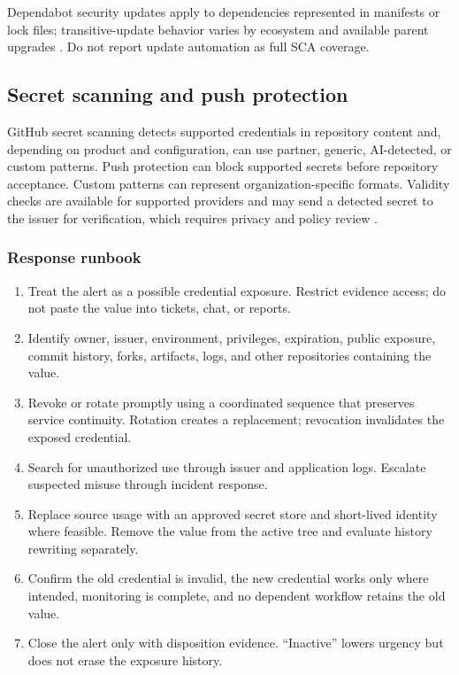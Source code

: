 \documentclass[11pt,letterpaper]{article}
\begin{document}
Dependabot security updates apply to dependencies represented in manifests or lock files; transitive-update behavior varies by ecosystem and available parent upgrades \citep{githubdependabot}. Do not report update automation as full SCA coverage.

\subsection{Secret scanning and push protection}

GitHub secret scanning detects supported credentials in repository content and, depending on product and configuration, can use partner, generic, AI-detected, or custom patterns. Push protection can block supported secrets before repository acceptance. Custom patterns can represent organization-specific formats. Validity checks are available for supported providers and may send a detected secret to the issuer for verification, which requires privacy and policy review \citep{githubsecrets,githubcustompatterns,githubvalidity}.

\subsubsection{Response runbook}

\begin{enumerate}
  \item Treat the alert as a possible credential exposure. Restrict evidence access; do not paste the value into tickets, chat, or reports.
  \item Identify owner, issuer, environment, privileges, expiration, public exposure, commit history, forks, artifacts, logs, and other repositories containing the value.
  \item Revoke or rotate promptly using a coordinated sequence that preserves service continuity. Rotation creates a replacement; revocation invalidates the exposed credential.
  \item Search for unauthorized use through issuer and application logs. Escalate suspected misuse through incident response.
  \item Replace source usage with an approved secret store and short-lived identity where feasible. Remove the value from the active tree and evaluate history rewriting separately.
  \item Confirm the old credential is invalid, the new credential works only where intended, monitoring is complete, and no dependent workflow retains the old value.
  \item Close the alert only with disposition evidence. ``Inactive'' lowers urgency but does not erase the exposure history.
\end{enumerate}
\end{document}
